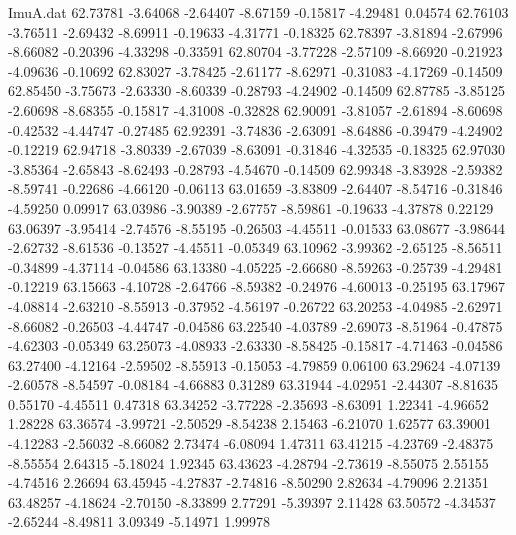 \begin{filecontents}{ImuA.dat}
  62.73781   -3.64068   -2.64407   -8.67159   -0.15817   -4.29481    0.04574
  62.76103   -3.76511   -2.69432   -8.69911   -0.19633   -4.31771   -0.18325
  62.78397   -3.81894   -2.67996   -8.66082   -0.20396   -4.33298   -0.33591
  62.80704   -3.77228   -2.57109   -8.66920   -0.21923   -4.09636   -0.10692
  62.83027   -3.78425   -2.61177   -8.62971   -0.31083   -4.17269   -0.14509
  62.85450   -3.75673   -2.63330   -8.60339   -0.28793   -4.24902   -0.14509
  62.87785   -3.85125   -2.60698   -8.68355   -0.15817   -4.31008   -0.32828
  62.90091   -3.81057   -2.61894   -8.60698   -0.42532   -4.44747   -0.27485
  62.92391   -3.74836   -2.63091   -8.64886   -0.39479   -4.24902   -0.12219
  62.94718   -3.80339   -2.67039   -8.63091   -0.31846   -4.32535   -0.18325
  62.97030   -3.85364   -2.65843   -8.62493   -0.28793   -4.54670   -0.14509
  62.99348   -3.83928   -2.59382   -8.59741   -0.22686   -4.66120   -0.06113
  63.01659   -3.83809   -2.64407   -8.54716   -0.31846   -4.59250    0.09917
  63.03986   -3.90389   -2.67757   -8.59861   -0.19633   -4.37878    0.22129
  63.06397   -3.95414   -2.74576   -8.55195   -0.26503   -4.45511   -0.01533
  63.08677   -3.98644   -2.62732   -8.61536   -0.13527   -4.45511   -0.05349
  63.10962   -3.99362   -2.65125   -8.56511   -0.34899   -4.37114   -0.04586
  63.13380   -4.05225   -2.66680   -8.59263   -0.25739   -4.29481   -0.12219
  63.15663   -4.10728   -2.64766   -8.59382   -0.24976   -4.60013   -0.25195
  63.17967   -4.08814   -2.63210   -8.55913   -0.37952   -4.56197   -0.26722
  63.20253   -4.04985   -2.62971   -8.66082   -0.26503   -4.44747   -0.04586
  63.22540   -4.03789   -2.69073   -8.51964   -0.47875   -4.62303   -0.05349
  63.25073   -4.08933   -2.63330   -8.58425   -0.15817   -4.71463   -0.04586
  63.27400   -4.12164   -2.59502   -8.55913   -0.15053   -4.79859    0.06100
  63.29624   -4.07139   -2.60578   -8.54597   -0.08184   -4.66883    0.31289
  63.31944   -4.02951   -2.44307   -8.81635    0.55170   -4.45511    0.47318
  63.34252   -3.77228   -2.35693   -8.63091    1.22341   -4.96652    1.28228
  63.36574   -3.99721   -2.50529   -8.54238    2.15463   -6.21070    1.62577
  63.39001   -4.12283   -2.56032   -8.66082    2.73474   -6.08094    1.47311
  63.41215   -4.23769   -2.48375   -8.55554    2.64315   -5.18024    1.92345
  63.43623   -4.28794   -2.73619   -8.55075    2.55155   -4.74516    2.26694
  63.45945   -4.27837   -2.74816   -8.50290    2.82634   -4.79096    2.21351
  63.48257   -4.18624   -2.70150   -8.33899    2.77291   -5.39397    2.11428
  63.50572   -4.34537   -2.65244   -8.49811    3.09349   -5.14971    1.99978

\end{filecontents}
